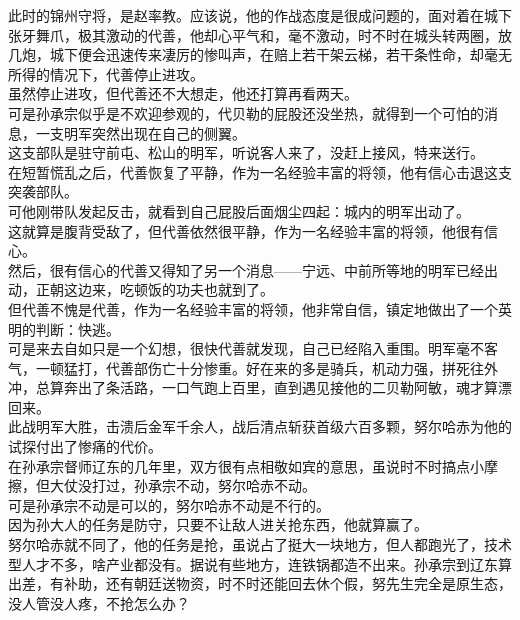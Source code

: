 \begin{multicols}{\theparacolNo}
此时的锦州守将，是赵率教。应该说，他的作战态度是很成问题的，面对着在城下张牙舞爪，极其激动的代善，他却心平气和，毫不激动，时不时在城头转两圈，放几炮，城下便会迅速传来凄厉的惨叫声，在赔上若干架云梯，若干条性命，却毫无所得的情况下，代善停止进攻。\\

虽然停止进攻，但代善还不大想走，他还打算再看两天。\\

可是孙承宗似乎是不欢迎参观的，代贝勒的屁股还没坐热，就得到一个可怕的消息，一支明军突然出现在自己的侧翼。\\

这支部队是驻守前屯、松山的明军，听说客人来了，没赶上接风，特来送行。\\

在短暂慌乱之后，代善恢复了平静，作为一名经验丰富的将领，他有信心击退这支突袭部队。\\

可他刚带队发起反击，就看到自己屁股后面烟尘四起：城内的明军出动了。\\

这就算是腹背受敌了，但代善依然很平静，作为一名经验丰富的将领，他很有信心。\\

然后，很有信心的代善又得知了另一个消息——宁远、中前所等地的明军已经出动，正朝这边来，吃顿饭的功夫也就到了。\\

但代善不愧是代善，作为一名经验丰富的将领，他非常自信，镇定地做出了一个英明的判断：快逃。\\

可是来去自如只是一个幻想，很快代善就发现，自己已经陷入重围。明军毫不客气，一顿猛打，代善部伤亡十分惨重。好在来的多是骑兵，机动力强，拼死往外冲，总算奔出了条活路，一口气跑上百里，直到遇见接他的二贝勒阿敏，魂才算漂回来。\\

此战明军大胜，击溃后金军千余人，战后清点斩获首级六百多颗，努尔哈赤为他的试探付出了惨痛的代价。\\

在孙承宗督师辽东的几年里，双方很有点相敬如宾的意思，虽说时不时搞点小摩擦，但大仗没打过，孙承宗不动，努尔哈赤不动。\\

可是孙承宗不动是可以的，努尔哈赤不动是不行的。\\

因为孙大人的任务是防守，只要不让敌人进关抢东西，他就算赢了。\\

努尔哈赤就不同了，他的任务是抢，虽说占了挺大一块地方，但人都跑光了，技术型人才不多，啥产业都没有。据说有些地方，连铁锅都造不出来。孙承宗到辽东算出差，有补助，还有朝廷送物资，时不时还能回去休个假，努先生完全是原生态，没人管没人疼，不抢怎么办？\\


\end{multicols}
